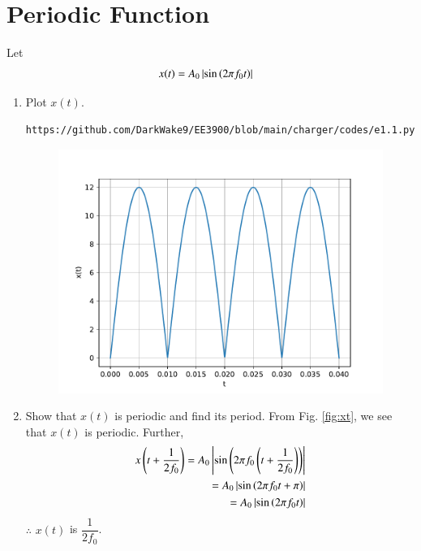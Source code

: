 \documentclass[journal,12pt,twocolumn]{IEEEtran}
\renewcommand\thesection{\arabic{section}}
\begin{document}
\section{Periodic Function}
Let 
\begin{align}
	x(t) &= A_0\left\vert\sin\left(2\pi f_0 t\right)\right\vert
	\label{eq:10-orig-diff-def}
\end{align}
\begin{enumerate}[label=\thesection.\arabic*
,ref=\thesection.\theenumi]
\item Plot $x(t)$.
\solution
\begin{lstlisting}
https://github.com/DarkWake9/EE3900/blob/main/charger/codes/e1.1.py
\end{lstlisting}
\begin{figure}[!ht]
	\begin{center}
		\includegraphics[width=\columnwidth]{./figs/e1.1.pdf}
	\end{center}
	\label{fig:}	
\end{figure}
\item Show that $x(t)$ is periodic and find its period.
\solution From Fig. \eqref{fig:xt}, we see that $x(t)$ is periodic. Further,
\begin{align}
	x\left(t+\frac{1}{2f_0}\right) = A_0\left\vert\sin\left(2\pi f_0\left(t + \frac{1}{2f_0}\right)\right)\right\vert \\
	= A_0\left\vert\sin\left(2\pi f_0t + \pi\right)\right\vert \\
	= A_0\left\vert\sin\left(2\pi f_0t\right)\right\vert
\end{align}
$\therefore$ $x(t)$ is $\dfrac{1}{2f_0}$.

\end{enumerate}
\end{document}

